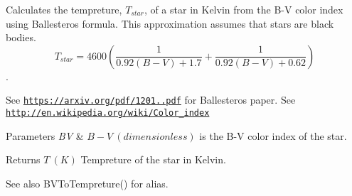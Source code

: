 Calculates the tempreture, $T_{star}$, of a star in Kelvin from the B-\/V color index using Ballesteros\textquotesingle{} formula. This approximation assumes that stars are black bodies. \[T_{star}=4600 \left ( \frac{1}{0.92 (B-V)+ 1.7} + \frac{1}{0.92 (B-V) + 0.62} \right )\]. 

See \href{https://arxiv.org/pdf/1201.1809.pdf}{\tt https\+://arxiv.\+org/pdf/1201..\+pdf} for Ballesteros\textquotesingle{} paper. See \href{http://en.wikipedia.org/wiki/Color_index}{\tt http\+://en.\+wikipedia.\+org/wiki/\+Color\+\_\+index}


\begin{DoxyParams}{Parameters}
{\em BV} & $B-V\ (dimensionless)$ is the B-\/V color index of the star. \\
\hline
\end{DoxyParams}
\begin{DoxyReturn}{Returns}
$T\ (K)$ Tempreture of the star in Kelvin. 
\end{DoxyReturn}
\begin{DoxySeeAlso}{See also}
B\+V\+To\+Tempreture() for alias. 
\end{DoxySeeAlso}
